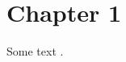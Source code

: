\documentclass{scrbook}
\begin{document}
\chapter{Chapter 1}

Some text \autocite{A01}.

\printbibliography
\end{document}

